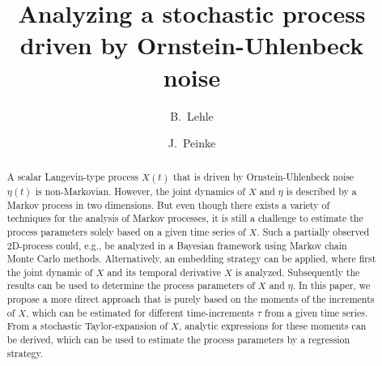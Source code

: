 \documentclass[aps,twocolumn,superscriptaddress,showpacs,showkeys]{revtex4}
\begin{document}

\title{Analyzing a stochastic process driven by Ornstein-Uhlenbeck noise}

\author{B.~Lehle}
\author{J.~Peinke}

\begin{abstract}
A scalar Langevin-type process $X(t)$ that is driven by Ornstein-Uhlenbeck noise $\eta(t)$ is non-Markovian.
However, the joint dynamics of $X$ and $\eta$ is described by a Markov process in two dimensions.
But even though there exists a variety of techniques for the analysis of Markov processes, it is still a challenge to
estimate the process parameters solely based on a given time series of $X$.
Such a partially observed 2D-process could, e.g., be analyzed in a Bayesian framework using Markov chain Monte Carlo methods.
Alternatively, an embedding strategy can be applied, where first the joint dynamic of $X$ and its temporal derivative
$\dot X$ is analyzed. Subsequently the results can be used to determine the process parameters of $X$ and $\eta$.
In this paper, we propose a more direct approach that is purely based on the moments of the increments of $X$, which
can be estimated for different time-increments $\tau$ from a given time series.
From a stochastic Taylor-expansion of $X$, analytic expressions for these moments can be derived, which can be used to
estimate the process parameters by a regression strategy.
\end{abstract}





\maketitle

\end{document}
